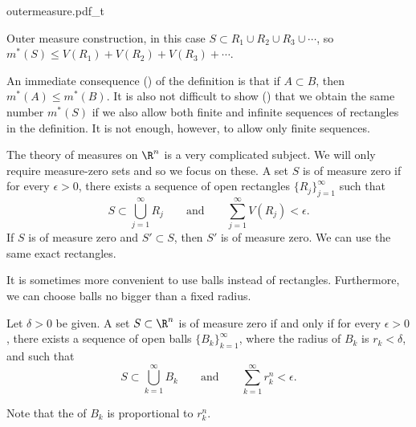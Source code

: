 \begin{myfigureht}
{outermeasure.pdf_t}
\caption{Outer measure construction, in this case $S \subset R_1 \cup R_2
\cup R_3 \cup \cdots$, so $m^*(S) \leq V(R_1) + V(R_2)+V(R_3) + \cdots$.\label{fig:outermeasure}}
\end{myfigureht}

An immediate consequence ()
of the definition is that if $A \subset B$,
then $m^*(A) \leq m^*(B)$.
It is also not difficult to show ()
that we obtain the same number
$m^*(S)$ if we also allow both finite and infinite sequences
of rectangles in the definition.  It is not enough, however, to allow only
finite sequences.

The theory of measures on $\R^n$ is a very complicated subject.
We will only require measure-zero sets and so we focus on these.
A set $S$ is of measure zero if
for every $\epsilon > 0$,
there exists a sequence of open rectangles $\{ R_j \}_{j=1}^\infty$ such that
\begin{equation} \label{mv:eq:nullR}
S \subset \bigcup_{j=1}^\infty R_j \qquad \text{and} \qquad
\sum_{j=1}^\infty V(R_j) < \epsilon.
\end{equation}
If $S$ is of measure zero and $S' \subset S$, then
$S'$ is of measure zero.  We can use the same exact rectangles.

\pagebreak[2]
It is sometimes more convenient to use balls instead of rectangles.
Furthermore, we can
choose balls no bigger than a fixed radius.

\begin{prop} \label{mv:prop:ballsnull}
Let $\delta > 0$ be given.
A set $S \subset \R^n$ is of measure zero if and only if for every $\epsilon >
0$, there exists a sequence of open balls $\{ B_k \}_{k=1}^\infty$, where the radius of
$B_k$ is $r_k < \delta$, and such that
\begin{equation*}
S \subset \bigcup_{k=1}^\infty B_k \qquad \text{and} \qquad
\sum_{k=1}^\infty r_k^n < \epsilon.
\end{equation*}
\end{prop}

Note that the  of $B_k$ is proportional to $r_k^n$.

